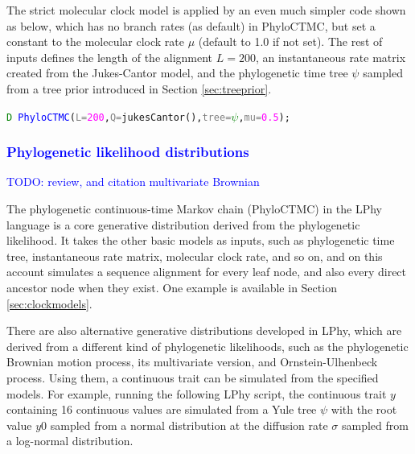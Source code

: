\documentclass[10pt,letterpaper,table]{article}
\begin{document}
{The strict molecular clock model is applied by an even much simpler code shown as below, which has no branch rates (as default) in PhyloCTMC, but set a constant to the molecular clock rate $\mu$ (default to 1.0 if not set). 
The rest of inputs defines the length of the alignment $L=200$, an instantaneous rate matrix created from the Jukes-Cantor model, and the phylogenetic time tree $\psi$ sampled from a tree prior introduced in Section \ref{sec:treeprior}.

{\small
\begin{alltt}
    \textcolor{green}{D} ~ \textcolor{blue}{PhyloCTMC}(\textcolor{gray}{L=}\textcolor{magenta}{200}, \textcolor{gray}{Q=}\textcolor{magenta!80!black}{jukesCantor}(), \textcolor{gray}{tree=}\textcolor{green}{\(\psi\)}, \textcolor{gray}{mu=}\textcolor{magenta}{0.5});
\end{alltt}
}


\textcolor{blue}{\subsubsection{Phylogenetic likelihood distributions}}

\textcolor{blue}{TODO: review, and citation multivariate Brownian}

The phylogenetic continuous-time Markov chain (PhyloCTMC) \cite{felsenstein1981} in the LPhy language is a core generative distribution derived from the phylogenetic likelihood. It takes the other basic models as inputs, such as phylogenetic time tree, instantaneous rate matrix, molecular clock rate, and so on, and on this account simulates a sequence alignment for every leaf node, and also every direct ancestor node when they exist. One example is available in Section \ref{sec:clockmodels}.

There are also alternative generative distributions developed in LPhy, which are derived from a different kind of phylogenetic likelihoods, such as the phylogenetic Brownian motion process\cite{felsenstein1973maximum}, its multivariate version\cite{}, and Ornstein-Ulhenbeck process\cite{felsenstein1973maximum}. Using them, a continuous trait can be simulated from the specified models.
For example, running the following LPhy script, the continuous trait $y$ containing 16 continuous values are simulated from a Yule tree $\psi$ with the root value $y0$ sampled from a normal distribution at the diffusion rate $\sigma$ sampled from a log-normal distribution.

}
\end{document}
